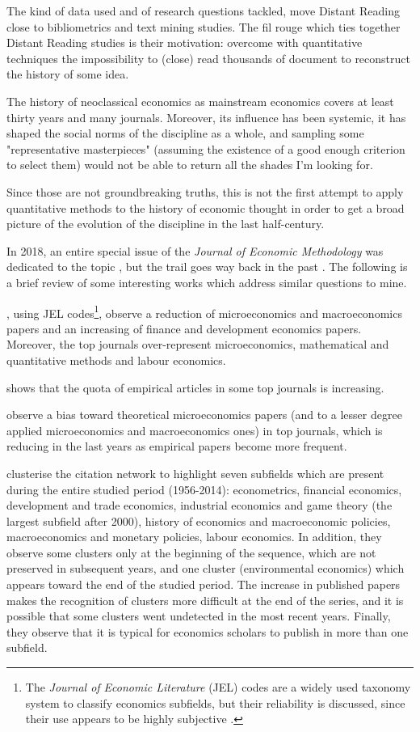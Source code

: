 \documentclass[a4paper, 11pt, headings=standardclasses, tablecaptionsbelow]{scrartcl}
\begin{document}
The kind of data used and of research questions tackled, move Distant Reading close to bibliometrics and text mining studies. The fil rouge
which ties together Distant Reading studies is their motivation: overcome with quantitative techniques the impossibility to (close) read thousands of document to reconstruct the history of some idea.

The history of neoclassical economics as mainstream economics covers at least thirty years and many journals. Moreover, its influence has been systemic, it has shaped the social norms of the discipline as a whole, and sampling some "representative masterpieces" (assuming the existence of a good enough criterion to select them) would not be able to return all the shades I'm looking for.

Since those are not groundbreaking truths, this is not the first attempt to apply quantitative methods to the history of economic thought in order to get a broad picture of the evolution of the discipline in the last half-century.

In 2018, an entire special issue of the \textit{Journal of Economic Methodology} was dedicated to the topic \parencite{edwards2018a,cherrier2018a}, but the trail goes way back in the past \parencite{backhouse1997}.
The following is a brief review of some interesting works which address similar questions to mine.

\textcite{kelly2011}, using JEL codes\footnote{The \textit{Journal of Economic Literature} (JEL) codes are a widely used taxonomy system to classify economics subfields, but their reliability is discussed, since their use appears to be highly subjective \parencite{cherrier2017,kosnik2018}.}, observe a reduction of microeconomics and macroeconomics papers and an increasing of finance and development economics papers.
Moreover, the top journals over-represent microeconomics, mathematical and quantitative methods and labour economics.

\textcite{hamermesh2013} shows that the quota of empirical articles in some top journals is increasing.

\textcite{card2013} observe a bias toward theoretical microeconomics papers (and to a lesser degree applied microeconomics and macroeconomics ones) in top journals, which is reducing in the last years as empirical papers become more frequent.

\textcite{claveau2016} clusterise the citation network to highlight seven subfields which are present during the entire studied period (1956-2014): econometrics, financial economics, development and trade economics, industrial economics and game theory (the largest subfield after 2000), history of economics and macroeconomic policies, macroeconomics and monetary policies, labour economics.
In addition, they observe some clusters only at the beginning of the sequence, which are not preserved in subsequent years, and one cluster (environmental economics) which appears toward the end of the studied period.
The increase in published papers makes the recognition of clusters more difficult at the end of the series, and it is possible that some clusters went undetected in the most recent years.
Finally, they observe that it is typical for economics scholars to publish in more than one subfield.
\end{document}
